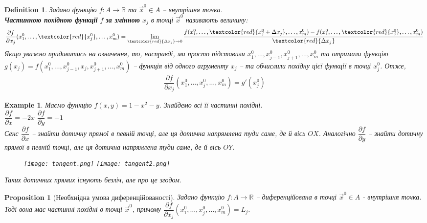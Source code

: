 \documentclass[a4paper, 10pt]{article}
\def\departial#1#2{\dfrac{\partial {#1}}{\partial {#2}}}
\def\huge{\displaystyle}
\theoremstyle{theoremdd}
\theoremstyle{theoremdd}
\theoremstyle{theoremdd}
\newtheorem{definition}[theorem]{Definition}
\theoremstyle{theoremdd}
\theoremstyle{theoremdd}
\newtheorem{example}[theorem]{Example}
\theoremstyle{theoremdd}
\newtheorem{proposition}[theorem]{Proposition}
\theoremstyle{theoremdd}
\theoremstyle{theoremdd}
\theoremstyle{theoremdd}
\begin{document}
\begin{definition}
Задано функцію $f \colon A \to \mathbb{R}$ та $\vec{x}^0 \in A$ -- внутрішня точка.\\
\textbf{Частинною похідною функції} $f$ \textbf{за змінною} $x_j$ в точці $\vec{x}^0$ називають величину:
\begin{align*}
\dfrac{\partial f}{\partial x_j} (x_1^0, \dots, \textcolor{red}{x_j^0}, \dots, x_m^0) = \huge \lim_{\textcolor{red}{\Delta x_j} \to 0} \dfrac{f(x_1^0,\dots,\textcolor{red}{x_j^0 + \Delta x_j}, \dots, x_m^0) - f(x_1^0,\dots,\textcolor{red}{x_j^0}, \dots, x_m^0)}{\textcolor{red}{\Delta x_j}}
\end{align*}
Якщо уважно придивитись на означення, то, насправді, ми просто підставили $x_1^0,\dots,x_{j-1}^0,x_{j+1}^0,\dots,x_m^0$ та отримали функцію $g(x_j) = f(x_1^0,\dots,x_{j-1}^0,x_j,x_{j+1}^0,\dots, x_m^0)$ -- функція від одного агрументу $x_j$ -- та обчислили похідну цієї функції в точці $x_j^0$. Отже,
\begin{align*}
\departial{f}{x_j}(x_1^0,\dots,x_j^0,\dots,x_m^0) = g'(x_j^0)
\end{align*}
\end{definition}

\begin{example}
Маємо функцію $f(x,y) = 1 - x^2 - y$. Знайдемо всі її частинні похідні.\\
$\departial{f}{x} = -2x$ \hspace{2cm} $\departial{f}{y} = -1$
\bigskip \\
Сенс $\departial{f}{x}$ -- знайти дотичну прямої в певній точці, але ця дотична напрямлена туди саме, де й вісь $OX$. Аналогічно $\departial{f}{y}$ -- знайти дотичну прямої в певній точці, але ця дотична напрямлена туди саме, де й вісь $OY$.
\begin{figure}[H]
\centering
\texttt{[image: tangent.png]}
\qquad
\texttt{[image: tangent2.png]}
\end{figure}
Таких дотичних прямих існують безліч, але про це згодом.
\end{example}


\begin{proposition}[Необхнідна умова диференційованості]
Задано функцію $f\colon A \to \mathbb{R}$ -- диференційована в точці $\vec{x}^0 \in A$ - внутрішня точка. Тоді вона має частинні похідні в точці $\vec{x}^0$, причому $\departial{f}{x_j} (x_1^0,\dots,x_j^0,\dots,x_m^0) = L_j$.
\end{proposition}
\end{document}

